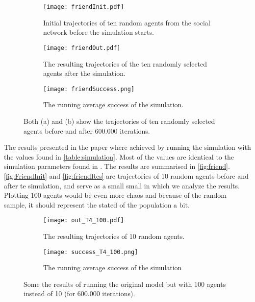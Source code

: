 \begin{figure}[t]
    \centering
    \begin{subfigure}[t]{0.35\textwidth}
        \centering
        \texttt{[image: friendInit.pdf]}
        \caption{Initial trajectories of ten random agents from the social network before the simulation starts.}
        \label{fig:FriendInit}
    \end{subfigure}
    \hfill
    \begin{subfigure}[t]{0.35\textwidth}
        \centering
        \texttt{[image: friendOut.pdf]}
        \caption{The resulting trajectories of the ten randomly selected agents after the simulation.}
        \label{fig:friendRes}
    \end{subfigure}
    \hfill
    \begin{subfigure}[t]{0.5\textwidth}
        \centering
        \texttt{[image: friendSuccess.png]}
        \caption{The running average success of the simulation.}
        \label{fig:friendSuccess}
    \end{subfigure}

    \caption{Both (a) and (b) show the trajectories of ten randomly selected agents before and after 600.000 iterations.}
    \label{fig:friend}
\end{figure}
The results presented in the paper where achieved by running the simulation with the values found in \autoref{table:simulation}.
Most of the values are identical to the simulation parameters found in \citep*{de2010multi}.
The results are summarised in \autoref{fig:friend}.
\autoref{fig:FriendInit} and \autoref{fig:friendRes} are trajectories of 10 random agents before and after te simulation, and serve as a small small in which we analyze the results.
Plotting 100 agents would be even more chaos and because of the random sample, it should represent the stated of the population a bit.

\begin{figure}[t]
    \centering
    \begin{subfigure}[t]{0.35\textwidth}
        \centering
        \texttt{[image: out\_T4\_100.pdf]}
        \caption{The resulting trajectories of 10 random agents.}
        \label{fig:Traject4Res100}
    \end{subfigure}
    \hfill
    \begin{subfigure}[t]{0.45\textwidth}
        \texttt{[image: success\_T4\_100.png]}
        \caption{The running average success of the simulation}
        \label{fig:Traject4Success100}
    \end{subfigure}

    \caption{Some the results of running the original model but with 100 agents instead of 10 (for 600.000 iterations).}
    \label{fig:Traject4_100}
\end{figure}

